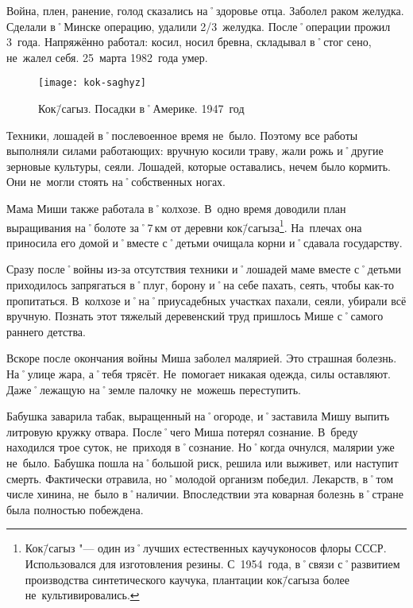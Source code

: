 Война, плен, ранение, голод сказались на˚здоровье отца. Заболел раком желудка. Сделали в˚Минске операцию, удалили 2/3~желудка. После˚операции прожил 3~года. Напряжённо работал: косил, носил бревна, складывал в˚стог сено, не~жалел себя. 25~марта 1982~года умер.

\begin{wrapfigure}{O}{.4\textwidth}
\centering
\texttt{[image: kok-saghyz]}
\caption[Кок\=/сагыз. Посадки в˚Америке. 1947~год]{Кок\=/сагыз. Посадки в˚Америке. 1947~год\footnotemark}
\label{fig:kok-saghyz}
\end{wrapfigure}

Техники, лошадей в˚послевоенное время не~было. Поэтому все работы выполняли силами работающих: вручную косили траву, жали рожь и˚другие зерновые культуры, сеяли. Лошадей, которые оставались, нечем было кормить. Они не~могли стоять на˚собственных ногах.

Мама Миши также работала в˚колхозе. В~одно время доводили план выращивания на˚болоте за˚7\,км от деревни кок\=/сагыза\footnote{Кок\=/сагыз "--- один из˚лучших естественных каучуконосов флоры СССР. Использовался для изготовления резины. С~1954~года, в˚связи с˚развитием производства синтетического каучука, плантации кок\=/сагыза более не~культивировались.}. На~плечах она приносила его домой и˚вместе с˚детьми очищала корни и˚сдавала государству.

Сразу после˚войны из-за отсутствия техники и˚лошадей маме вместе с˚детьми приходилось запрягаться в˚плуг, борону и˚на себе пахать, сеять, чтобы как-то пропитаться. В~колхозе и˚на˚приусадебных участках пахали, сеяли, убирали всё вручную. Познать этот тяжелый деревенский труд пришлось  Мише с˚самого раннего детства.

Вскоре после окончания войны Миша заболел малярией. Это страшная болезнь. На˚улице жара, а˚тебя трясёт. Не~помогает никакая одежда, силы оставляют. Даже˚лежащую на˚земле палочку не~можешь переступить. 

Бабушка заварила табак, выращенный на˚огороде, и˚заставила Мишу выпить литровую кружку отвара. После˚чего Миша потерял сознание. В~бреду находился трое суток, не~приходя в˚сознание. Но˚когда очнулся, малярии уже не~было. Бабушка пошла на˚большой риск, решила или выживет, или наступит смерть. Фактически отравила, но˚молодой организм победил. Лекарств, в˚том числе хинина, не~было в˚наличии. Впоследствии эта коварная болезнь в˚стране была полностью побеждена.


